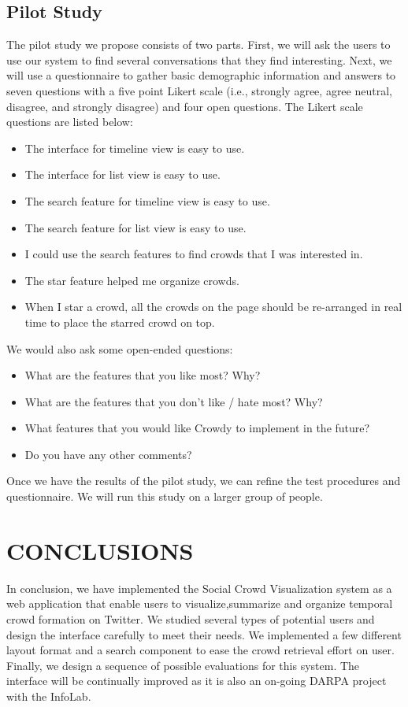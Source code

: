 \documentclass{sig-alternate}
\begin{document}
\subsection{Pilot Study}

The pilot study we propose consists of two parts. First, we will ask the users
to use our system to find several conversations that they find interesting.
Next, we will use a questionnaire to gather basic demographic information and
answers to seven questions with a five point Likert scale (i.e., strongly
agree, agree neutral, disagree, and strongly disagree) and four open questions.
The Likert scale questions are listed below:

\begin{itemize}
\item The interface for timeline view is easy to use.
\item The interface for list view is easy to use.
\item The search feature for timeline view is easy to use.
\item The search feature for list view is easy to use.
\item I could use the search features to find crowds that I was interested in.
\item The star feature helped me organize crowds.
\item When I star a crowd, all the crowds on the page should be re-arranged in real time to place the starred crowd on top.
\end{itemize}

We would also ask some open-ended questions:
\begin{itemize}
\item What are the features that you like most? Why?
\item What are the features that you don't like / hate most? Why?
\item What features that you would like Crowdy to implement in the future?
\item Do you have any other comments? 
\end{itemize}

Once we have the results of the pilot study, we can refine the test procedures
and questionnaire. We will run this study on a larger group of people.

\section{CONCLUSIONS}
In conclusion, we have implemented the Social Crowd Visualization system as a
web application that enable users to visualize,summarize and organize temporal
crowd formation on Twitter. We studied several types of potential users and
design the interface carefully to meet their needs. We implemented a few
different layout format and a search component to ease the crowd retrieval
effort on user. Finally, we design a sequence of possible evaluations for this
system. The interface will be continually improved as it is also an on-going
DARPA project with the InfoLab. 
\end{document}
